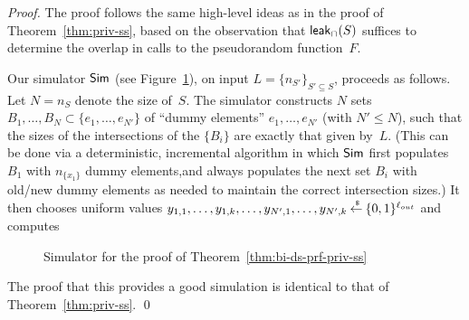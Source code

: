\begin{proof}
The proof follows the same high-level ideas as in the proof of
Theorem~\ref{thm:priv-ss}, based on the observation that ${\sf
leak}_\cap(S)$ suffices to determine the overlap in calls to the
pseudorandom function~$F$.

Our simulator ${\sf Sim}$ (see Figure~\ref{fig:sim-bi-ds-prf}), on input $L = \{n_{S'}\}_{S' \subseteq S}$,
proceeds as follows. Let $N = n_S$ denote the size of~$S$. The
simulator constructs $N$ sets $B_1, \ldots, B_N \subset \{e_1,
\ldots, e_{N'}\}$ of ``dummy elements'' $e_1, \ldots, e_{N'}$ (with
$N' \leq N$), such that the sizes of the intersections of the
$\{B_i\}$ are exactly that given by~$L$. (This can be done via a
deterministic, incremental algorithm in which ${\sf Sim}$ first populates
$B_1$ with $n_{\{x_1\}}$ dummy elements,and always populates the
next set $B_i$ with old/new dummy elements as needed to maintain the
correct intersection sizes.) It then chooses uniform values
$y_{1,1}, \ldots, y_{1,k}, \ldots, y_{N',1}, \ldots, y_{N',k} {\:\stackrel{{\scriptscriptstyle \hspace{0.2em}\$}} {\leftarrow}\:}
\{0,1\}^{\ell_{out}}$ and computes

\begin{figure}[th]
\centering
{}
\caption{Simulator for the proof of Theorem~\ref{thm:bi-ds-prf-priv-ss} }
\label{fig:sim-bi-ds-prf}
\end{figure}

The proof that this provides a good simulation is identical to that
of Theorem~\ref{thm:priv-ss}. \hfill\qed
\end{proof}


